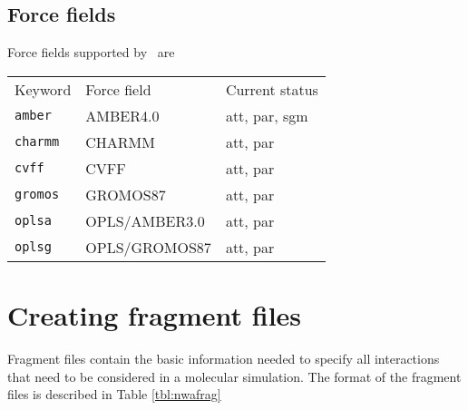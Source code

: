 \subsection{Force fields}
\label{sec:nwaforcefields}
Force fields supported by \nwargos\ are
\begin{center}
\begin{tabular}{lll}
\hline
Keyword      & Force field   & Current status \\
{\tt amber}  & AMBER4.0      & att, par, sgm  \\
{\tt charmm} & CHARMM        & att, par       \\
{\tt cvff}   & CVFF          & att, par       \\
{\tt gromos} & GROMOS87      & att, par       \\
{\tt oplsa}  & OPLS/AMBER3.0 & att, par       \\
{\tt oplsg}  & OPLS/GROMOS87 & att, par       \\
\hline
\end{tabular}
\end{center}  

\section{Creating fragment files}
Fragment files contain the basic information needed to specify all
interactions that need to be considered in a molecular simulation.
The format of the fragment files is described in Table \ref{tbl:nwafrag}

